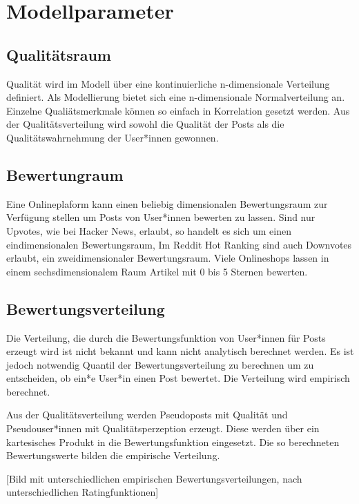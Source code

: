 \chapter{Modellparameter}

\section{Qualitätsraum}

Qualität wird im Modell über eine kontinuierliche n-dimensionale Verteilung definiert. Als Modellierung bietet sich eine n-dimensionale Normalverteilung an. Einzelne Qualiätsmerkmale können so einfach in Korrelation gesetzt werden. Aus der Qualitätsverteilung wird sowohl die Qualität der Posts als die Qualitätswahrnehmung der User*innen gewonnen.

\section{Bewertungraum}

Eine Onlineplaform kann einen beliebig dimensionalen Bewertungsraum zur Verfügung stellen um Posts von User*innen bewerten zu lassen. Sind nur Upvotes, wie bei Hacker News, erlaubt, so handelt es sich um einen eindimensionalen Bewertungsraum, Im Reddit Hot Ranking sind auch Downvotes erlaubt, ein zweidimensionaler Bewertungsraum. Viele Onlineshops lassen in einem sechsdimensionalem Raum Artikel mit 0 bis 5 Sternen bewerten.

\section{Bewertungsverteilung}

Die Verteilung, die durch die Bewertungsfunktion von User*innen für Posts erzeugt wird ist nicht bekannt und kann nicht analytisch berechnet werden. Es ist jedoch notwendig Quantil der Bewertungsverteilung zu berechnen um zu entscheiden, ob ein*e User*in einen Post bewertet. Die Verteilung wird empirisch berechnet.

Aus der Qualitätsverteilung werden Pseudoposts mit Qualität und Pseudouser*innen mit Qualitätsperzeption erzeugt. Diese werden über ein kartesisches Produkt in die Bewertungsfunktion eingesetzt. Die so berechneten Bewertungswerte bilden die empirische Verteilung. 


[Bild mit unterschiedlichen empirischen Bewertungsverteilungen, nach unterschiedlichen Ratingfunktionen]




